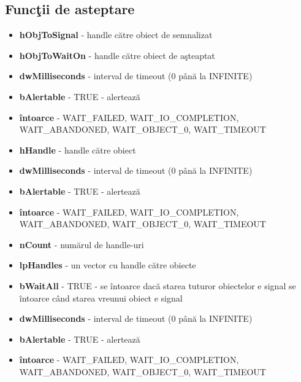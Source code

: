\documentclass{refcard.cs.pub.ro}
\begin{document}
\begin{multicols*}{3}
\vspace*{-0.2cm}
\section{ Funcţii de asteptare}

\begin{itemize}
  \item \textbf{hObjToSignal} - handle către obiect de semnalizat
  \item \textbf{hObjToWaitOn} - handle către obiect de aşteaptat
  \item \textbf{dwMilliseconds} - interval de timeout (0 până la INFINITE)
  \item \textbf{bAlertable} - TRUE - alertează
  \item \textbf{întoarce} - WAIT_FAILED, WAIT_IO_COMPLETION, WAIT_ABANDONED, WAIT_OBJECT_0, WAIT_TIMEOUT
\end{itemize}


\begin{itemize}
  \item \textbf{hHandle} - handle către obiect
  \item \textbf{dwMilliseconds} - interval de timeout (0 până la INFINITE)
  \item \textbf{bAlertable} - TRUE - alertează
  \item \textbf{întoarce} - WAIT_FAILED, WAIT_IO_COMPLETION, WAIT_ABANDONED, WAIT_OBJECT_0, WAIT_TIMEOUT
\end{itemize}


\begin{itemize}
  \item \textbf{nCount} - numărul de handle-uri
  \item \textbf{lpHandles} - un vector cu handle către obiecte
  \item \textbf{bWaitAll} - TRUE - se întoarce dacă starea tuturor obiectelor e signal
 se întoarce când starea vreunui obiect e signal
  \item \textbf{dwMilliseconds} - interval de timeout (0 până la INFINITE)
  \item \textbf{bAlertable} - TRUE - alertează
  \item \textbf{întoarce} - WAIT_FAILED, WAIT_IO_COMPLETION, WAIT_ABANDONED, WAIT_OBJECT_0, WAIT_TIMEOUT
\end{itemize}


\end{multicols*}
\end{document}
